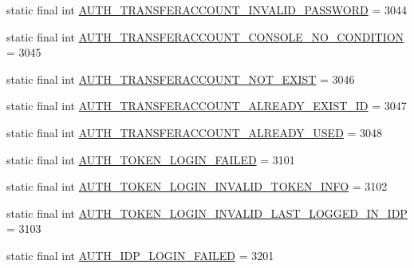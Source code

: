 \begin{DoxyCompactItemize}
\item 
static final int \hyperlink{classcom_1_1toast_1_1android_1_1gamebase_1_1base_1_1_gamebase_error_a8f58dff8c4020b1e9f5c22872755cbc3}{A\+U\+T\+H\+\_\+\+T\+R\+A\+N\+S\+F\+E\+R\+A\+C\+C\+O\+U\+N\+T\+\_\+\+I\+N\+V\+A\+L\+I\+D\+\_\+\+P\+A\+S\+S\+W\+O\+RD} = 3044
\item 
static final int \hyperlink{classcom_1_1toast_1_1android_1_1gamebase_1_1base_1_1_gamebase_error_ac7d5cc89dbe9946ea0627df20b146491}{A\+U\+T\+H\+\_\+\+T\+R\+A\+N\+S\+F\+E\+R\+A\+C\+C\+O\+U\+N\+T\+\_\+\+C\+O\+N\+S\+O\+L\+E\+\_\+\+N\+O\+\_\+\+C\+O\+N\+D\+I\+T\+I\+ON} = 3045
\item 
static final int \hyperlink{classcom_1_1toast_1_1android_1_1gamebase_1_1base_1_1_gamebase_error_aec819b44145f3a56260746c04db34afe}{A\+U\+T\+H\+\_\+\+T\+R\+A\+N\+S\+F\+E\+R\+A\+C\+C\+O\+U\+N\+T\+\_\+\+N\+O\+T\+\_\+\+E\+X\+I\+ST} = 3046
\item 
static final int \hyperlink{classcom_1_1toast_1_1android_1_1gamebase_1_1base_1_1_gamebase_error_af2d25a71f73d86d2d7c6b24720de1738}{A\+U\+T\+H\+\_\+\+T\+R\+A\+N\+S\+F\+E\+R\+A\+C\+C\+O\+U\+N\+T\+\_\+\+A\+L\+R\+E\+A\+D\+Y\+\_\+\+E\+X\+I\+S\+T\+\_\+\+ID} = 3047
\item 
static final int \hyperlink{classcom_1_1toast_1_1android_1_1gamebase_1_1base_1_1_gamebase_error_a9905d64fe24b0e61cccdfe5d692c0c69}{A\+U\+T\+H\+\_\+\+T\+R\+A\+N\+S\+F\+E\+R\+A\+C\+C\+O\+U\+N\+T\+\_\+\+A\+L\+R\+E\+A\+D\+Y\+\_\+\+U\+S\+ED} = 3048
\item 
static final int \hyperlink{classcom_1_1toast_1_1android_1_1gamebase_1_1base_1_1_gamebase_error_aaae26d8e17568a291fa6cdbd2d114eac}{A\+U\+T\+H\+\_\+\+T\+O\+K\+E\+N\+\_\+\+L\+O\+G\+I\+N\+\_\+\+F\+A\+I\+L\+ED} = 3101
\item 
static final int \hyperlink{classcom_1_1toast_1_1android_1_1gamebase_1_1base_1_1_gamebase_error_a9840976e9e86bd14afe85b34daed8778}{A\+U\+T\+H\+\_\+\+T\+O\+K\+E\+N\+\_\+\+L\+O\+G\+I\+N\+\_\+\+I\+N\+V\+A\+L\+I\+D\+\_\+\+T\+O\+K\+E\+N\+\_\+\+I\+N\+FO} = 3102
\item 
static final int \hyperlink{classcom_1_1toast_1_1android_1_1gamebase_1_1base_1_1_gamebase_error_a943e4518d95e4dda2ad4b28dce7aa355}{A\+U\+T\+H\+\_\+\+T\+O\+K\+E\+N\+\_\+\+L\+O\+G\+I\+N\+\_\+\+I\+N\+V\+A\+L\+I\+D\+\_\+\+L\+A\+S\+T\+\_\+\+L\+O\+G\+G\+E\+D\+\_\+\+I\+N\+\_\+\+I\+DP} = 3103
\item 
static final int \hyperlink{classcom_1_1toast_1_1android_1_1gamebase_1_1base_1_1_gamebase_error_a763cdc51f2566c1933972492992a94ac}{A\+U\+T\+H\+\_\+\+I\+D\+P\+\_\+\+L\+O\+G\+I\+N\+\_\+\+F\+A\+I\+L\+ED} = 3201

\end{DoxyCompactItemize}
